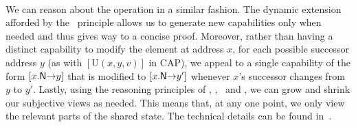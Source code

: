 {\\}
%
%
We can reason about the  operation in a similar
fashion. The dynamic extension afforded by the \extendRule\ principle
allows us to generate new capabilities only when needed and thus gives
way to a concise proof. 
%
Moreover, rather than having a distinct capability to modify the element at address $x$, for each possible successor address $y$ (as with $[\text{U}(x, y, v)]$ in CAP), we appeal to a single capability of the form $[\nextC{x}{y}]$ that is modified to $[\nextC{x}{y'}]$ whenever $x$'s successor changes from $y$ to $y'$.
%
Lastly, using the reasoning principles of \mergeRule, \forgetRule,
\shiftRule\ and \copyRule, we can grow and shrink our subjective views
as needed. This means that,  at any one point, we only view the relevant parts of the shared state. 
%
The technical details can be found in~\cite{colosl-tr14}. 

